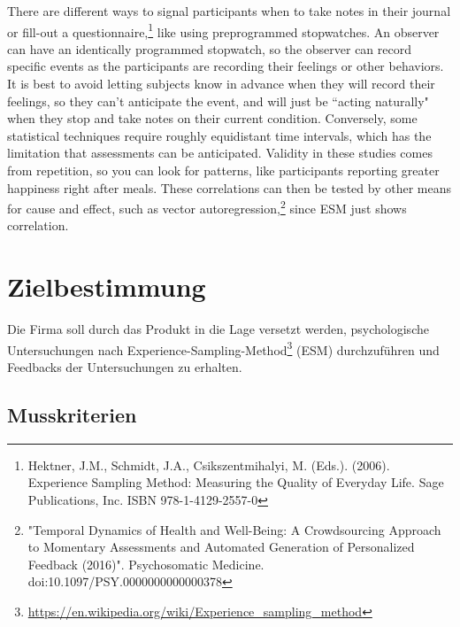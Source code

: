 \documentclass[a4paper]{scrreprt}
\begin{document}
        There are different ways to signal participants when to take notes in their journal or fill-out a questionnaire,\footnote{Hektner, J.M., Schmidt, J.A., Csikszentmihalyi, M. (Eds.). (2006). Experience Sampling Method: Measuring the Quality of Everyday Life. Sage Publications, Inc. ISBN 978-1-4129-2557-0} like using preprogrammed stopwatches. An observer can have an identically programmed stopwatch, so the observer can record specific events as the participants are recording their feelings or other behaviors. It is best to avoid letting subjects know in advance when they will record their feelings, so they can't anticipate the event, and will just be ``acting naturally" when they stop and take notes on their current condition. Conversely, some statistical techniques require roughly equidistant time intervals, which has the limitation that assessments can be anticipated. Validity in these studies comes from repetition, so you can look for patterns, like participants reporting greater happiness right after meals. These correlations can then be tested by other means for cause and effect, such as vector autoregression,\footnote{"Temporal Dynamics of Health and Well-Being: A Crowdsourcing Approach to Momentary Assessments and Automated Generation of Personalized Feedback (2016)". Psychosomatic Medicine. doi:10.1097/PSY.0000000000000378} since ESM just shows correlation.

 
    \chapter{Zielbestimmung}
        Die Firma soll durch das Produkt in die Lage versetzt werden, psychologische Untersuchungen nach Experience-Sampling-Method\footnote{\url{https://en.wikipedia.org/wiki/Experience_sampling_method}} (ESM) durchzuf\"uhren und Feedbacks der Untersuchungen zu erhalten.
 
 
        \section{Musskriterien}
\end{document}
